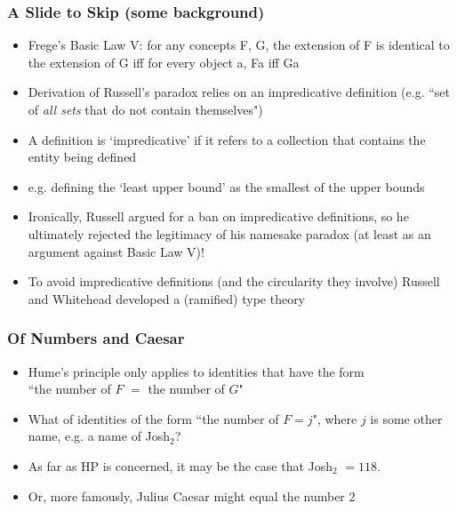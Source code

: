 \begin{frame}
\frametitle{A Slide to Skip (some background)}


\begin{itemize}%

\item Frege's Basic Law V: for any concepts F, G, the extension of F is identical to the extension of G iff for every object a, Fa iff Ga

\item Derivation of Russell's paradox relies on an impredicative definition (e.g. ``set of \textit{all sets} that do not contain themselves")

\item A definition is `impredicative' if it refers to a collection that contains the entity being defined

\item[] e.g. defining the `least upper bound' as the smallest of the upper bounds

\item Ironically, Russell argued for a ban on impredicative definitions, so he ultimately rejected the legitimacy of his namesake paradox (at least as an argument against Basic Law V)!

\item To avoid impredicative definitions (and the circularity they involve) Russell and Whitehead developed a (ramified) type theory 


\end{itemize}
\end{frame}

\begin{frame}
\frametitle{Of Numbers and Caesar}

\begin{itemize}[<+->]

\item Hume's principle only applies to identities that have the form \\ ``the number of $F$ $=$ the number of $G$"

\item What of identities of the form ``the number of $F = j$", where $j$ is some other name, e.g. a name of Josh$_2$? 

\item As far as HP is concerned, it may be the case that Josh$_2$ $= 118$.  

\item Or, more famously, Julius Caesar might equal the number $2 $


\end{itemize}
\end{frame}


